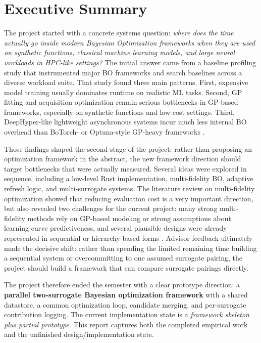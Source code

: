 \documentclass[11pt]{article}
\begin{document}
\section{Executive Summary}

The project started with a concrete systems question: \emph{where does the time actually go inside modern Bayesian Optimization frameworks when they are used on synthetic functions, classical machine learning models, and large neural workloads in HPC-like settings?} The initial answer came from a baseline profiling study that instrumented major BO frameworks and search baselines across a diverse workload suite. That study found three main patterns. First, expensive model training usually dominates runtime on realistic ML tasks. Second, GP fitting and acquisition optimization remain serious bottlenecks in GP-based frameworks, especially on synthetic functions and low-cost settings. Third, DeepHyper-like lightweight asynchronous systems incur much less internal BO overhead than BoTorch- or Optuna-style GP-heavy frameworks \cite{oumer2026baseline}.

Those findings shaped the second stage of the project: rather than proposing an optimization framework in the abstract, the new framework direction should target bottlenecks that were actually measured. Several ideas were explored in sequence, including a low-level Rust implementation, multi-fidelity BO, adaptive refresh logic, and multi-surrogate systems. The literature review on multi-fidelity optimization showed that reducing evaluation cost is a very important direction, but also revealed two challenges for the current project: many strong multi-fidelity methods rely on GP-based modeling or strong assumptions about learning-curve predictiveness, and several plausible designs were already represented in sequential or hierarchy-based forms \cite{won2025review, do2024review, rakotoarison2024ifbo, wu2020takg}. Advisor feedback ultimately made the decisive shift: rather than spending the limited remaining time building a sequential system or overcommitting to one assumed surrogate pairing, the project should build a framework that can compare surrogate pairings directly.

The project therefore ended the semester with a clear prototype direction: a \textbf{parallel two-surrogate Bayesian optimization framework} with a shared datastore, a common optimization loop, candidate merging, and per-surrogate contribution logging. The current implementation state is a \emph{framework skeleton plus partial prototype}.  This report captures both the completed empirical work and the unfinished design/implementation state.
\end{document}
